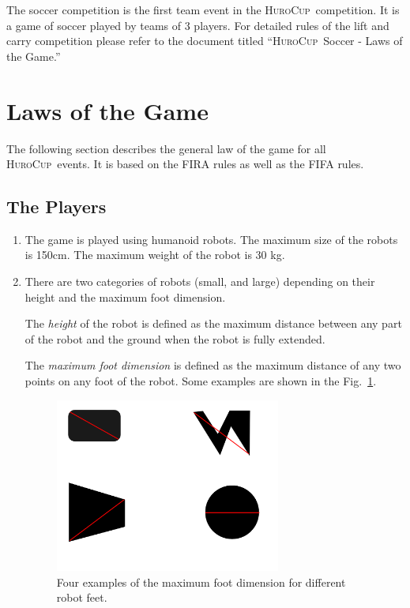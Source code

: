 \documentclass[12pt]{article}
\newcommand{\HuroCup}{\textsc{HuroCup}}
\newcounter{law}[section]
\newcommand{\law}[2][Law]{ %
  \refstepcounter{law} %
  \renewcommand\thesubsection{#1-\arabic{law}} %
  \subsection{\hfill #2} %
}
\newenvironment{lawlist}[1][Law]{ %
  \begin{enumerate} %
    \renewcommand{\theenumi}{#1-\arabic{law}.\arabic{enumi}}} %
  {\end{enumerate}}
\begin{document}
The soccer competition is the first team event in the \HuroCup\
competition. It is a game of soccer played by teams of 3 players. For
detailed rules of the lift and carry competition please refer to the
document titled ``\HuroCup\ Soccer - Laws of the Game.''

\section{Laws of the Game}
\label{sec:laws}

The following section describes the general law of the game for all
\HuroCup\  events. It is based on the FIRA rules as well as the FIFA
rules. 

\law{The Players}
\label{law:players}

\begin{lawlist}
\item \label{humanoid} The game is played using humanoid robots. The
  maximum size of the robots is 150cm. The maximum weight of the robot
  is 30 kg.
\item \label{categories} There are two categories of robots (small,
and large) depending on their height and the maximum foot
dimension. 

The \emph{height} of the robot is defined as the maximum distance
between any part of the robot and the ground when the robot is fully
extended.

The \emph{maximum foot dimension} is defined as the maximum
distance of any two points on any foot of the robot. Some
examples are shown in the Fig.~\ref{fig:foot-dimension}.

  \begin{figure}
    \begin{center}
      \includegraphics[width=0.7\textwidth]{Figures/foot-dimension}
    \end{center}
    \caption{Four examples of the maximum foot dimension for different
     robot feet.}
    \label{fig:foot-dimension}
  \end{figure}


\end{lawlist}
\end{document}
